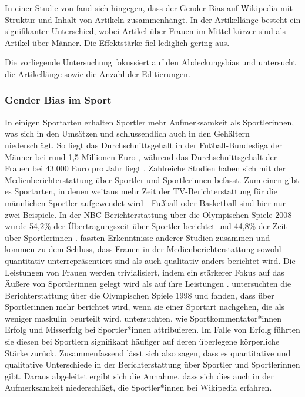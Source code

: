 \documentclass[11pt]{article}
\begin{document}
In einer Studie von  \textcite{GraellsGarrido2015} fand sich hingegen, dass der Gender Bias auf Wikipedia mit Struktur und Inhalt von Artikeln zusammenhängt. In der Artikellänge besteht ein signifikanter Unterschied, wobei Artikel über Frauen im Mittel kürzer sind als Artikel über Männer. Die Effektstärke fiel lediglich gering aus.

Die vorliegende Untersuchung fokussiert auf den Abdeckungsbias und untersucht die Artikellänge sowie die Anzahl der Editierungen.

\subsubsection{Gender Bias im Sport}

In einigen Sportarten erhalten Sportler mehr Aufmerksamkeit als Sportlerinnen, was sich in den Umsätzen und schlussendlich auch in den Gehältern niederschlägt. So liegt das Durchschnittsgehalt in der Fußball-Bundesliga der Männer bei rund 1,5 Millionen Euro \parencite{Harris2015}, während das Durchschnittsgehalt der Frauen bei 43.000 Euro pro Jahr liegt \parencite{soccerIncomeWomen}. Zahlreiche Studien haben sich mit der Medienberichterstattung über Sportler und Sportlerinnen befasst. Zum einen gibt es Sportarten, in denen weitaus mehr Zeit der TV-Berichterstattung für die männlichen Sportler aufgewendet wird - Fußball oder Basketball sind hier nur zwei Beispiele. In der NBC-Berichterstattung über die Olympischen Spiele 2008 wurde 54,2\% der Übertragungszeit über Sportler berichtet und 44,8\% der Zeit über Sportlerinnen \parencite{Billings2008}. \textcite{Trolan2013} fassten Erkenntnisse anderer Studien zusammen und kommen zu dem Schluss, dass Frauen in der Medienberichterstattung sowohl quantitativ unterrepräsentiert sind als auch qualitativ anders berichtet wird. Die Leistungen von Frauen werden trivialisiert, indem ein stärkerer Fokus auf das Äußere von Sportlerinnen gelegt wird als auf ihre Leistungen \parencite{Harris2005,Vincent2004}. \textcite{Jones1999} untersuchten die Berichterstattung über die Olympischen Spiele 1998 und fanden, dass über Sportlerinnen mehr berichtet wird, wenn sie einer Sportart nachgehen, die als weniger maskulin beurteilt wird. \textcite{Billings2008} untersuchten, wie Sportkommentator*innen Erfolg und Misserfolg bei Sportler*innen attribuieren. Im Falle von Erfolg führten sie diesen bei Sportlern signifikant häufiger auf deren überlegene körperliche Stärke zurück.
Zusammenfassend lässt sich also sagen, dass es quantitative und qualitative Unterschiede in der Berichterstattung über Sportler und Sportlerinnen gibt. Daraus abgeleitet ergibt sich die Annahme, dass sich dies auch in der Aufmerksamkeit niederschlägt, die Sportler*innen bei Wikipedia erfahren.
\end{document}
